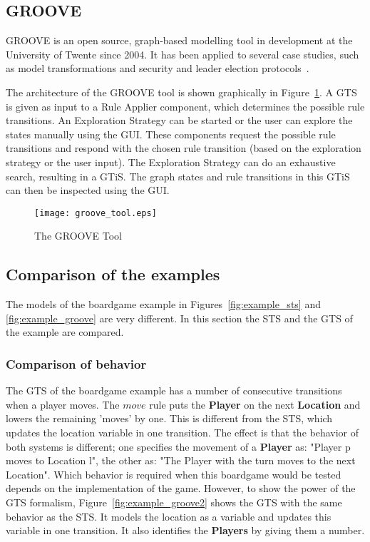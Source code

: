 \subsection{GROOVE}\label{sec:descriptiongroove}
GROOVE is an open source, graph-based modelling tool in development at the University of Twente since 2004. It has been applied to several case studies, such as model transformations and security and leader election protocols~\cite{Ghamarian:GROOVE}.

The architecture of the GROOVE tool is shown graphically in Figure~\ref{fig:groove_tool}. A GTS is given as input to a Rule Applier component, which determines the possible rule transitions. An Exploration Strategy can be started or the user can explore the states manually using the GUI. These components request the possible rule transitions and respond with the chosen rule transition (based on the exploration strategy or the user input). The Exploration Strategy can do an exhaustive search, resulting in a GTiS. The graph states and rule transitions in this GTiS can then be inspected using the GUI.

\begin{figure}[h]
  \begin{center}
    \texttt{[image: groove\_tool.eps]}
  \end{center}
  \caption{The GROOVE Tool}
  \label{fig:groove_tool}
\end{figure}

\subsection{Comparison of the examples}\label{sec:comparison}
The models of the boardgame example in Figures~\ref{fig:example_sts} and \ref{fig:example_groove} are very different. In this section the STS and the GTS of the example are compared.

\subsubsection{Comparison of behavior}
The GTS of the boardgame example has a number of consecutive transitions when a player moves. The $move$ rule puts the \textbf{Player} on the next \textbf{Location} and lowers the remaining 'moves' by one. This is different from the STS, which updates the location variable in one transition. The effect is that the behavior of both systems is different; one specifies the movement of a \textbf{Player} as: "Player p moves to Location l", the other as: "The Player with the turn moves to the next Location". Which behavior is required when this boardgame would be tested depends on the implementation of the game. However, to show the power of the GTS formalism, Figure~\ref{fig:example_groove2} shows the GTS with the same behavior as the STS. It models the location as a variable and updates this variable in one transition. It also identifies the \textbf{Players} by giving them a number.

